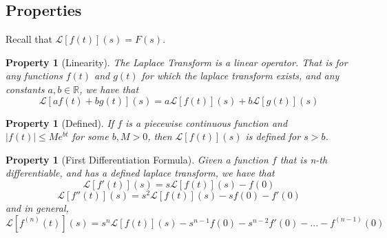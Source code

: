 \documentclass[12pt]{article}
\newtheorem{pro}[thm]{Property}
\theoremstyle{definition}
\theoremstyle{remark}
\numberwithin{equation}{section}
\newcommand\R{\mathbb R}    %
\begin{document}
\vspace{1cm}

\subsection{Properties}

Recall that $\mathcal{L}[f(t)](s) = F(s)$.

\begin{pro}[Linearity]
        The Laplace Transform is a linear operator. That is for any functions $f(t)$ and $g(t)$ for which the laplace transform exists, and any constants $a,b \in \R$, we have that \begin{equation}
                \mathcal{L}[af(t)+bg(t)](s)=a\mathcal{L}[f(t)](s)+b\mathcal{L}[g(t)](s)
        \end{equation}
\end{pro}


\vspace{1cm}


\begin{pro}[Defined]
        If $f$ is a piecewise continuous function and $|f(t)| \leq Me^{bt}$ for some $b,M > 0$, then $\mathcal{L}[f(t)](s)$ is defined for $s > b$.
\end{pro}


\vspace{1cm}


\begin{pro}[First Differentiation Formula]
        Given a function $f$ that is n-th differentiable, and has a defined laplace transform, we have that \begin{equation}
                \mathcal{L}[f'(t)](s) = s\mathcal{L}[f(t)](s) - f(0) 
        \end{equation}
        \begin{equation}
                \mathcal{L}[f''(t)](s) = s^2\mathcal{L}[f(t)](s) - sf(0) - f'(0)
        \end{equation}
        and in general,  \begin{equation}
                \mathcal{L}[f^{(n)}(t)](s) = s^n\mathcal{L}[f(t)](s) - s^{n-1}f(0) - s^{n-2}f'(0) - ... - f^{(n-1)}(0) 
        \end{equation}
\end{pro}


\vspace{1cm}
\end{document}

